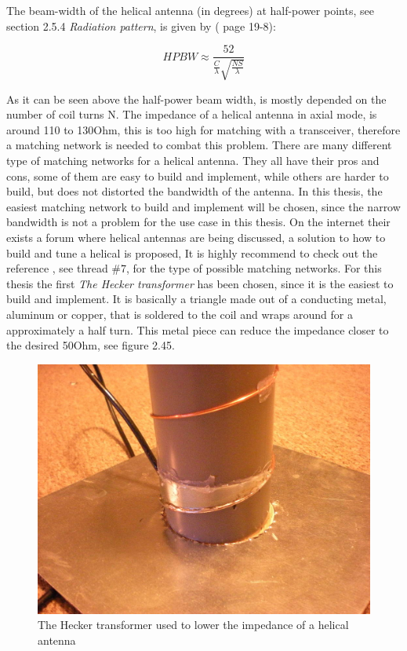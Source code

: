 The beam-width of the helical antenna (in degrees) at half-power points, see section 2.5.4 \textit{Radiation pattern}, is given by (\cite{ARRL} page 19-8):

\begin{equation}
   HPBW \approx \frac{52}{\frac{C}{\lambda}\sqrt{\frac{NS}{\lambda}}}
\end{equation}

As it can be seen above the half-power beam width, is mostly depended on the number of coil turns N.
The impedance of a helical antenna in axial mode, is around 110 to 130Ohm, this is too high for matching with a transceiver, therefore a matching network is needed to combat this problem. There are many different type of matching networks for a helical antenna. They all have their pros and cons, some of them are easy to build and implement, while others are harder to build, but does not distorted the bandwidth of the antenna. In this thesis, the easiest matching network to build and implement will be chosen, since the narrow bandwidth is not a problem for the use case in this thesis. On the internet their exists a forum where helical antennas are being discussed, a solution to how to build and tune a helical is proposed, It is highly recommend to check out the reference \cite{RCGroups}, see thread \#7, for the type of possible matching networks. For this thesis the first \textit{The Hecker transformer} has been chosen, since it is the easiest to build and implement. It is basically a triangle made out of a conducting metal, aluminum or copper, that is soldered to the coil and wraps around for a approximately a half turn. This metal piece can reduce the impedance closer to the desired 50Ohm, see figure 2.45.  

\begin{figure}[h]
\centering
\includegraphics[scale=0.8]{figures/FormerHelical.jpg}
\caption{The Hecker transformer used to lower the impedance of a helical antenna}
\end{figure}

